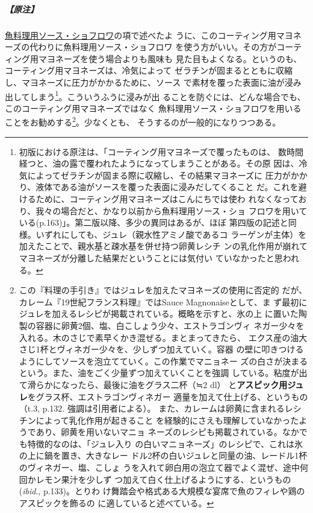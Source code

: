 \begin{recette}
\hypertarget{nota-mayonnaise-collee}{%
\subparagraph{【原注】}\label{nota-mayonnaise-collee}}

\protect\hyperlink{sauce-chaud-froid-maigre}{魚料理用ソース・ショフロワ}の項で述べたよ
うに、このコーティング用マヨネーズの代わりに魚料理用ソース・ショフロワ
を使う方がいい。その方がコーティング用マヨネーズを使う場合よりも風味も
見た目もよくなる。というのも、コーティング用マヨネーズは、冷気によって
ゼラチンが固まるとともに収縮し、マヨネーズに圧力がかかるために、ソース
で素材を覆った表面に油が浸み出してしまう\footnote{初版における原注は、「コーティング用マヨネーズで覆ったものは、
  数時間経つと、油の露で覆われたようになってしまうことがある。その原
  因は、冷気によってゼラチンが固まる際に収縮し、その結果マヨネーズに
  圧力がかかり、液体である油がソースを覆った表面に浸みだしてくること
  だ。これを避けるために、コーティング用マヨネーズはこんにちでは使わ
  れなくなっており、我々の場合だと、かなり以前から魚料理用ソース・ショ
  フロワを用いている(p.163)」。第二版以降、多少の異同はあるが、ほぼ
  第四版の記述と同様。いずれにしても、ジュレ（親水性アミノ酸であるコ
  ラーゲンが主体）を加えたことで、親水基と疎水基を併せ持つ卵黄レシチ
  ンの乳化作用が崩れてマヨネーズが分離した結果だということには気付い
  ていなかったと思われる。}。こういうふうに浸みが出
ることを防ぐには、どんな場合でも、このコーティング用マヨネーズではなく
魚料理用ソース・ショフロワを用いることをお勧めする\footnote{この『料理の手引き』ではジュレを加えたマヨネーズの使用に否定的
  だが、カレーム『19世紀フランス料理』ではSauce Magnonaiseとして、ま
  ず最初にジュレを加えるレシピが掲載されている。概略を示すと、氷の上
  に置いた陶製の容器に卵黄2個、塩、白こしょう少々、エストラゴンヴィ
  ネガー少々を入れる。木のさじで素早くかき混ぜる。まとまってきたら、
  エクス産の油大さじ1杯とヴィネガー少々を、少しずつ加えていく。容器
  の壁に叩きつけるようにしてソースを泡立てていく。この作業でマニョネー
  ズの白さが決まるという。また、油をごく少量ずつ加えていくことを強調
  している。粘度が出て滑らかになったら、最後に油をグラス二杯（≒2 dl）
  と\textbf{アスピック用ジュレ}をグラス\undemi{}杯、エストラゴンヴィネガー
  適量を加えて仕上げる、というもの（t.3, p.132. 強調は引用者による）。
  また、カレームは卵黄に含まれるレシチンによって乳化作用が起きること
  を経験的にさえも理解していなかったようであり、卵黄を用いないマニョ
  ネーズのレシピも掲載されている。なかでも特徴的なのは、「ジュレ入り
  の白いマニョネーズ」のレシピで、これは氷の上に鍋を置き、大きなレー
  ドル2杯の白いジュレと同量の油、レードル1杯のヴィネガー、塩、こしょ
  うを入れて卵白用の泡立て器でよく混ぜ、途中何回かレモン果汁を少しず
  つ加えて白く仕上げるようにする、というもの(\emph{ibid}.,
  p.133)。とりわ
  け舞踏会や格式ある大規模な宴席で魚のフィレや鶏のアスピックを飾るの
  に適していると述べている。}。少なくとも、
そうするのが一般的になりつつある。


\end{recette}
